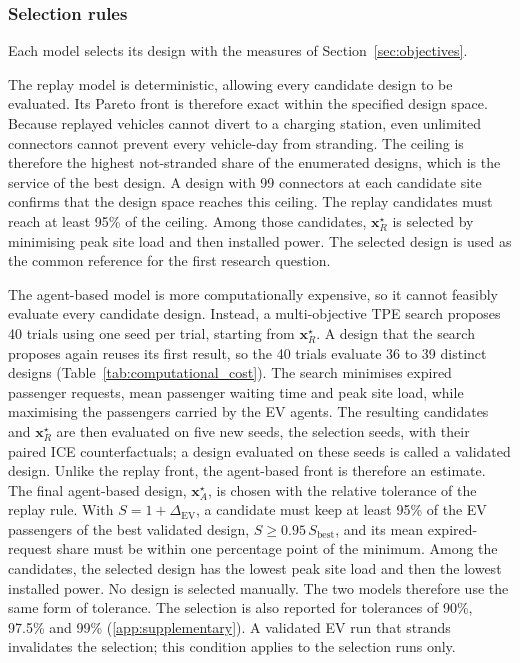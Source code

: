 \documentclass{elsarticle}
\newcommand{\xR}{\ensuremath{\mathbf{x}_R^{\star}}}
\newcommand{\xA}{\ensuremath{\mathbf{x}_A^{\star}}}
\begin{document}
\subsubsection{Selection rules}
\label{sec:selection}

Each model selects its design with the measures of Section~\ref{sec:objectives}.

The replay model is deterministic, allowing every candidate design to be evaluated. Its Pareto front is therefore exact within the specified design space. Because replayed vehicles cannot divert to a charging station, even unlimited connectors cannot prevent every vehicle-day from stranding. The ceiling is therefore the highest not-stranded share of the enumerated designs, which is the service of the best design. A design with 99 connectors at each candidate site confirms that the design space reaches this ceiling. The replay candidates must reach at least 95\% of the ceiling. Among those candidates, \(\xR\) is selected by minimising peak site load and then installed power. The selected design is used as the common reference for the first research question.

The agent-based model is more computationally expensive, so it cannot feasibly evaluate every candidate design. Instead, a multi-objective TPE search proposes 40 trials using one seed per trial, starting from \(\xR\). A design that the search proposes again reuses its first result, so the 40 trials evaluate 36 to 39 distinct designs (Table~\ref{tab:computational_cost}). The search minimises expired passenger requests, mean passenger waiting time and peak site load, while maximising the passengers carried by the EV agents. The resulting candidates and \(\xR\) are then evaluated on five new seeds, the selection seeds, with their paired ICE counterfactuals; a design evaluated on these seeds is called a validated design. Unlike the replay front, the agent-based front is therefore an estimate. The final agent-based design, \(\xA\), is chosen with the relative tolerance of the replay rule. With \(S = 1 + \Delta_{\mathrm{EV}}\), a candidate must keep at least 95\% of the EV passengers of the best validated design, \(S \ge 0.95\,S_{\text{best}}\), and its mean expired-request share must be within one percentage point of the minimum. Among the candidates, the selected design has the lowest peak site load and then the lowest installed power. No design is selected manually. The two models therefore use the same form of tolerance. The selection is also reported for tolerances of 90\%, 97.5\% and 99\% (\ref{app:supplementary}). A validated EV run that strands invalidates the selection; this condition applies to the selection runs only.
\end{document}
